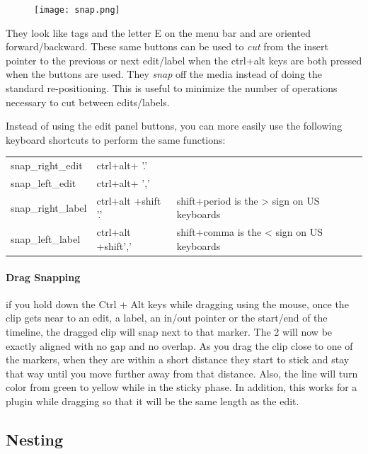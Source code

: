 \begin{figure}
  \vspace{-2ex}
  \centering
  \texttt{[image: snap.png]}
\end{figure}

They look like tags and the letter E on the menu bar and are
oriented forward/backward.  These same buttons can be used to
\textit{cut} from the insert pointer to the previous or next
edit/label when the ctrl+alt keys are both pressed when the buttons
are used.  They \textit{snap} off the media instead of doing the
standard re-positioning.  This is useful to minimize the number of
operations necessary to cut between edits/labels.

Instead of using the edit panel buttons, you can more easily use the
following keyboard shortcuts to perform the same functions:

\begin{center}
  \begin{tabular}{lll}
    \toprule
    snap\_right\_edit & ctrl+alt+ '.' &\\
        snap\_left\_edit & ctrl+alt+ ',' &\\
    snap\_right\_label & ctrl+alt +shift '.' & shift+period is the > sign on US keyboards\\
    snap\_left\_label &  ctrl+alt +shift',' & shift+comma is the < sign on US keyboards\\
    \bottomrule
  \end{tabular}
\end{center}

\paragraph{Drag Snapping} if you hold down the Ctrl + Alt keys while
dragging using the mouse, once the clip gets near to an edit, a
label, an in/out pointer or the start/end of the timeline, the
dragged clip will snap next to that marker.  The 2 will now be
exactly aligned with no gap and no overlap.  As you drag the clip
close to one of the markers, when they are within a short distance
they start to stick and stay that way until you move further away
from that distance.  Also, the line will turn color from green to
yellow while in the sticky phase.  In addition, this works for a
plugin while dragging so that it will be the same length as the edit.


\subsection{Nesting}%
\label{sub:nesting}

